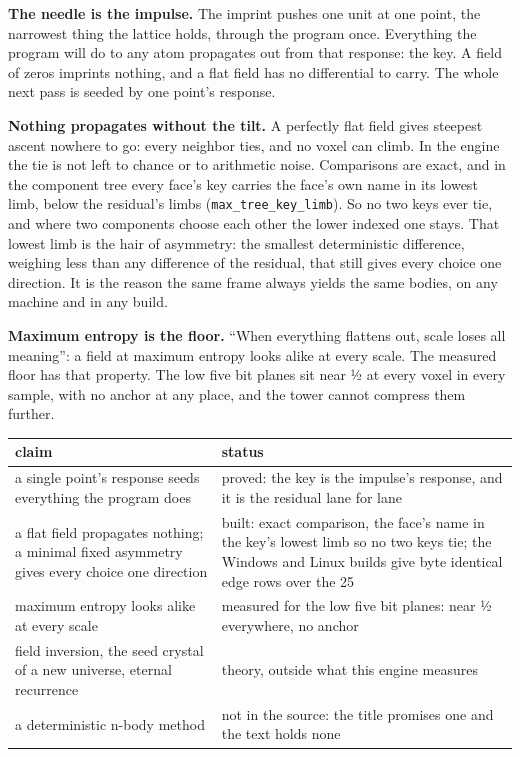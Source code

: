 \textbf{The needle is the impulse.} The imprint pushes one unit at one point, the narrowest thing the lattice holds, through the program once. Everything the program will do to any atom propagates out from that response: the key. A field of zeros imprints nothing, and a flat field has no differential to carry. The whole next pass is seeded by one point's response.

\textbf{Nothing propagates without the tilt.} A perfectly flat field gives steepest ascent nowhere to go: every neighbor ties, and no voxel can climb. In the engine the tie is not left to chance or to arithmetic noise. Comparisons are exact, and in the component tree every face's key carries the face's own name in its lowest limb, below the residual's limbs (\texttt{max\_\allowbreak{}tree\_\allowbreak{}key\_\allowbreak{}limb}). So no two keys ever tie, and where two components choose each other the lower indexed one stays. That lowest limb is the hair of asymmetry: the smallest deterministic difference, weighing less than any difference of the residual, that still gives every choice one direction. It is the reason the same frame always yields the same bodies, on any machine and in any build.

\textbf{Maximum entropy is the floor.} “When everything flattens out, scale loses all meaning”: a field at maximum entropy looks alike at every scale. The measured floor has that property. The low five bit planes sit near ½ at every voxel in every sample, with no anchor at any place, and the tower cannot compress them further.

{\small
\setlength{\tabcolsep}{6pt}
\begin{longtable}{>{\RaggedRight\arraybackslash}p{}>{\RaggedRight\arraybackslash}p{}}
\toprule
claim & status \\
\midrule
\endhead
a single point's response seeds everything the program does & proved: the key is the impulse's response, and it is the residual lane for lane \\
a flat field propagates nothing; a minimal fixed asymmetry gives every choice one direction & built: exact comparison, the face's name in the key's lowest limb so no two keys tie; the Windows and Linux builds give byte identical edge rows over the 25 \\
maximum entropy looks alike at every scale & measured for the low five bit planes: near ½ everywhere, no anchor \\
field inversion, the seed crystal of a new universe, eternal recurrence & theory, outside what this engine measures \\
a deterministic n-body method & not in the source: the title promises one and the text holds none \\
\bottomrule
\end{longtable}
}

